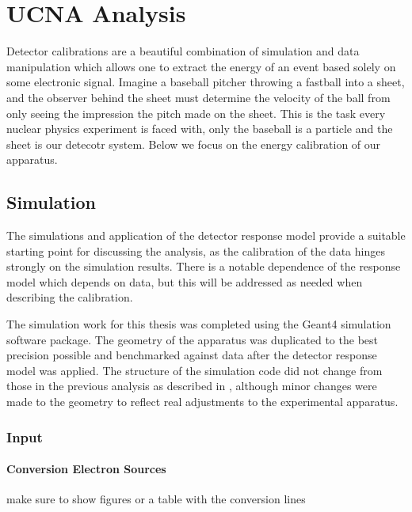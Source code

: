 \chapter{UCNA Analysis}
\label{ch:UCNA_Analysis}

Detector calibrations are a beautiful combination
of simulation and data manipulation which allows one to extract the energy of
an event based solely on some electronic signal. Imagine a baseball pitcher
throwing a fastball into a sheet, and the observer behind the sheet must
determine the velocity of the ball from only seeing the impression the pitch
made on the sheet. This is the task every nuclear physics experiment is faced
with, only the baseball is a particle and the sheet is our detecotr system.
Below we focus on the energy calibration of our apparatus.


\section{Simulation}
\label{sec:Simulation}

The simulations and application of the
detector response model provide a suitable starting
point for discussing the analysis, as the calibration of the data hinges
strongly on the simulation results. There is a notable dependence of the
response model which depends on data, but this will be addressed as needed
when describing the calibration.

The simulation work for this thesis was completed
using the Geant4 simulation software package. The geometry of the
apparatus was duplicated
to the best precision possible and benchmarked against data after
the detector response model was applied. The structure
of the simulation code did not change from those in the previous analysis
as described in \cite{mpmThesis}, although minor changes were
made to the geometry to reflect real adjustments to the experimental
apparatus.

\subsection{Input}
\subsubsection{Conversion Electron Sources}
make sure to show figures or a table with the conversion lines
